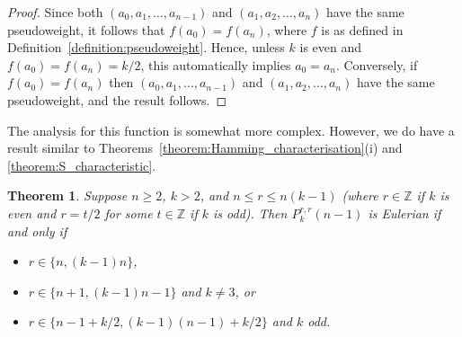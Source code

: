 \documentclass[a4paper,11pt]{article}
\theoremstyle{plain}
\newtheorem{theorem}[lemma]{Theorem}
\theoremstyle{definition}
\theoremstyle{remark}
\begin{document}
\begin{proof}
Since both $(a_0,a_1,\dots,a_{n-1})$ and $(a_1,a_2,\dots,a_{n})$ have the same pseudoweight, it
follows that $f(a_0)=f(a_n)$, where $f$ is as defined in Definition~\ref{definition:pseudoweight}.
Hence, unless $k$ is even and $f(a_0)=f(a_n)=k/2$, this automatically implies $a_0=a_n$.
Conversely, if $f(a_0)=f(a_n)$ then $(a_0,a_1,\dots,a_{n-1})$ and $(a_1,a_2,\dots,a_{n})$ have the
same pseudoweight, and the result follows.
\end{proof}

The analysis for this function is somewhat more complex.  However, we do have a result similar to
Theorems~\ref{theorem:Hamming_characterisation}(i) and \ref{theorem:S_characteristic}.

\begin{theorem}  \label{theorem:P_characteristic_a}
Suppose $n\geq2$, $k>2$, and $n\leq r\leq n(k-1)$ (where $r\in\mathbb{Z}$ if $k$ is even and
$r=t/2$ for some $t\in\mathbb{Z}$ if $k$ is odd). Then $P_k^{r,r}(n-1)$ is Eulerian if and only if
\begin{itemize}
\item[(i)] $r\in\{n,(k-1)n\}$,
\item[(ii)] $r\in\{n+1,(k-1)n-1\}$ and $k\neq3$, or
\item[(iii)]  $r\in\{n-1+k/2,(k-1)(n-1)+k/2\}$ and $k$ odd.
\end{itemize}
\end{theorem}
\end{document}
